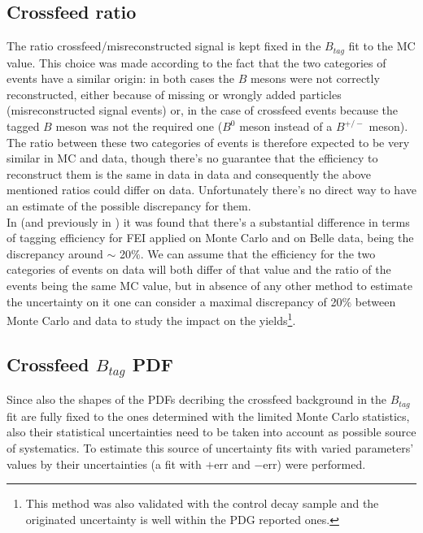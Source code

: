 \subsection{Crossfeed ratio}\label{sec:CrossfeedRatioSysBtoLambdaC}
The ratio crossfeed/misreconstructed signal is kept fixed in the $B_{tag}$ fit to the MC value.
 This choice was made according to the fact that the two categories of events have  
a similar origin: in both cases the $B$ mesons were not correctly reconstructed, either because of missing or wrongly added particles 
(misreconstructed signal events) or, in the case of crossfeed events because the tagged $B$ meson was not the required
 one ($B^0$ meson instead of a $B^{+/-}$ meson). 
The ratio between these two categories of events is therefore expected to be very similar in MC and data, 
though there's no guarantee that the efficiency to reconstruct them is the same in data in data and consequently 
the above mentioned ratios could differ on data. Unfortunately there's no direct way to have an estimate of the possible 
discrepancy for them.\\  
In \cite{gelb_moritz_2018_21546} (and previously in \cite{schwab_judith_2017_21422}) it was found that there's a substantial 
difference in terms of tagging efficiency for FEI applied on Monte Carlo and on Belle data, being the discrepancy around $\sim$ 20$\%$. 
We can assume that the efficiency for the two categories of events on data will both differ of that value and the ratio of the events 
being the same MC value, but in absence of any other method to estimate the uncertainty on it one can consider a maximal 
discrepancy of 20$\%$ between Monte Carlo and data to study the impact on the yields\footnote{This method was also validated 
with the control decay sample and the originated uncertainty is well within the PDG reported ones.}. 

\subsection{Crossfeed $B_{tag}$ PDF}
Since also the shapes of the PDFs decribing the crossfeed background in the $B_{tag}$ fit are fully fixed to the
ones determined with the limited Monte Carlo statistics, also their statistical uncertainties
need to be taken into account as possible source of systematics.
To estimate this source of uncertainty fits with varied parameters' values by their uncertainties 
(a fit with $+$err and $-$err) were performed.

